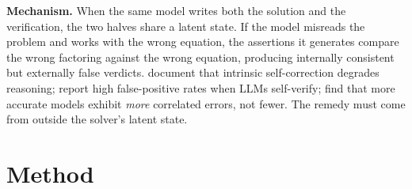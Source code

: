 \documentclass{article}
\begin{document}
\textbf{Mechanism.} When the same model writes both the solution and the verification, the two halves share a latent state. If the model misreads the problem and works with the wrong equation, the assertions it generates compare the wrong factoring against the wrong equation, producing internally consistent but externally false verdicts. \citet{huang2024selfcorrect} document that intrinsic self-correction degrades reasoning; \citet{stechly2024selfverify} report high false-positive rates when LLMs self-verify; \citet{kim2025correlated} find that more accurate models exhibit \emph{more} correlated errors, not fewer. The remedy must come from outside the solver's latent state.

\section{Method}
\label{sec:method}
\end{document}
